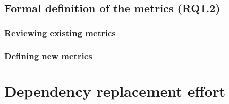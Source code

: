 \subsection{Formal definition of the metrics (RQ1.2)}

\subsubsection{Reviewing existing metrics}

\subsubsection{Defining new metrics}

\section{Dependency replacement effort}
